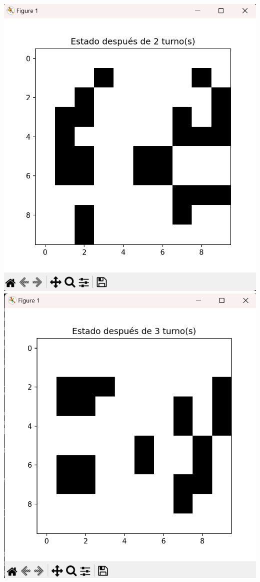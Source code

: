 \begin{itemize}
\begin{center}
        \includegraphics[scale=0.4]{IMA/ejemplosJuegoVida/ejemplo 1.3.png}
        \includegraphics[scale=0.4]{IMA/ejemplosJuegoVida/ejemplo 1.4.png}

\end{center}
\end{itemize}
